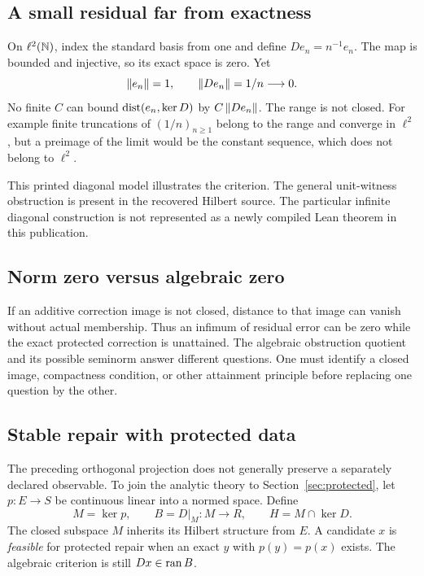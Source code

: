 \subsection{A small residual far from exactness}
On \(\ell^2(\mathbb N)\), index the standard basis from one and define \(De_n=n^{-1}e_n\). The map is bounded and injective, so its exact space is zero. Yet
\[
 \left\lVert e_n\right\rVert=1,\qquad\left\lVert De_n\right\rVert=1/n\longrightarrow0.
\]
No finite \(C\) can bound \(\operatorname{dist}(e_n,\ker D)\) by \(C\left\lVert De_n\right\rVert\). The range is not closed. For example finite truncations of \((1/n)_{n\ge1}\) belong to the range and converge in \(\ell^2\), but a preimage of the limit would be the constant sequence, which does not belong to \(\ell^2\).

This printed diagonal model illustrates the criterion. The general unit-witness obstruction is present in the recovered Hilbert source. The particular infinite diagonal construction is not represented as a newly compiled Lean theorem in this publication.


\subsection{Norm zero versus algebraic zero}
If an additive correction image is not closed, distance to that image can vanish without actual membership. Thus an infimum of residual error can be zero while the exact protected correction is unattained. The algebraic obstruction quotient and its possible seminorm answer different questions. One must identify a closed image, compactness condition, or other attainment principle before replacing one question by the other.

\subsection{Stable repair with protected data}
The preceding orthogonal projection does not generally preserve a separately declared observable. To join the analytic theory to Section~\ref{sec:protected}, let \(p:E\to S\) be continuous linear into a normed space. Define
\[
 M=\ker p,\qquad B=D|_M:M\to R,\qquad H=M\cap\ker D.
\]
The closed subspace \(M\) inherits its Hilbert structure from \(E\). A candidate \(x\) is \emph{feasible} for protected repair when an exact \(y\) with \(p(y)=p(x)\) exists. The algebraic criterion is still \(Dx\in\operatorname{ran} B\).

